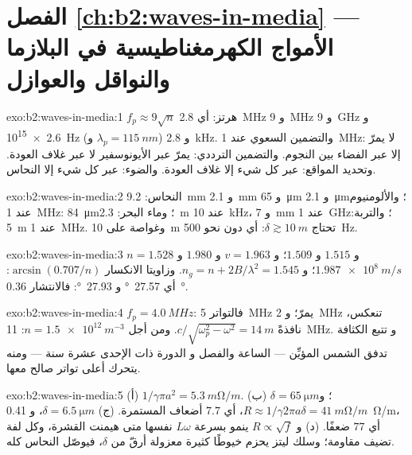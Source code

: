 \section*{الفصل \ref{ch:b2:waves-in-media} --- الأمواج الكهرمغناطيسية في البلازما والنواقل والعوازل}

\begin{solution}{exo:b2:waves-in-media:1}
$f_p \approx 9\sqrt n$ هرتز: أي \qty{2.8}{MHz} و \qty{9}{MHz} و \qty{9}{GHz} و \qty{2.6e15}{Hz}
(و $\lambda_p = \qty{115}{nm}$) و \qty{2.8}{kHz}. والتضمين السعوي عند \qty{1}{MHz}: لا يمرّ إلا عبر
الفضاء بين النجوم. والتضمين الترددي: يمرّ عبر الأيونوسفير لا عبر غلاف العودة. وتحديد المواقع:
عبر كل شيء إلا غلاف العودة. والضوء: عبر كل شيء إلا النحاس.
\end{solution}

\begin{solution}{exo:b2:waves-in-media:2}
النحاس: \qty{9.2}{mm} و \qty{2.1}{mm} و \qty{65}{\micro m} و \qty{2.1}{\micro m}؛ والألومنيوم عند
\qty{1}{MHz}: \qty{84}{\micro m}؛ وماء البحر: \qty{2.3}{m} عند \qty{10}{kHz}، و \qty{7}{mm} عند
\qty{1}{GHz}؛ والتربة: \qty{5}{m} عند \qty{1}{MHz}. وغواصة على \qty{10}{m} تحتاج $\delta
\gtrsim \qty{10}{m}$: أي دون نحو \qty{500}{Hz}.
\end{solution}

\begin{solution}{exo:b2:waves-in-media:3}
$n = 1.528$ و $1.515$ و $1.509$؛ و $v = 1.963$ و $1.980$ و $\qty{1.987e8}{m/s}$؛ و $n_g = n +
2B/\lambda^2 = 1.545$. وزاويتا الانكسار $\arcsin(0.707/n)$: أي \qty{27.57}{\degree} و
\qty{27.93}{\degree}: فالانتشار \qty{0.36}{\degree}.
\end{solution}

\begin{solution}{exo:b2:waves-in-media:4}
$f_p = \qty{4.0}{MHz}$: فالتواتر \qty{5}{MHz} يمرّ؛ و \qty{2}{MHz} تنعكس، نافذةً
$c/\sqrt{\omega_p^2 - \omega^2} = \qty{14}{m}$. ومن أجل $n = \qty{1.5e12}{m^{-3}}$: \qty{11}{MHz}. و
تتبع الكثافة تدفق الشمس المؤيِّن --- الساعة والفصل و
الدورة ذات الإحدى عشرة سنة --- ومنه يتحرك أعلى تواتر صالح معها.
\end{solution}

\begin{solution}{exo:b2:waves-in-media:5}
(أ) $1/\gamma\pi a^2 = \qty{5.3}{m\ohm/m}$. (ب) $\delta = \qty{65}{\micro m}$؛ و $R \approx 1/\gamma2\pi a\delta
= \qty{41}{m\ohm/m}$، أي $7.7$ أضعاف المستمرة. (ج) $\delta = \qty{6.5}{\micro m}$، و \qty{0.41}{\ohm/m}،
أي $77$ ضعفًا. (د) و $R \propto \sqrt f$ ينمو بسرعة $L\omega$ نفسها متى هيمنت
القشرة، وكل لفة تضيف مقاومة؛ وسلك ليتز يحزم خيوطًا كثيرة
معزولة أرقّ من $\delta$، فيوصّل النحاس كله.
\end{solution}

